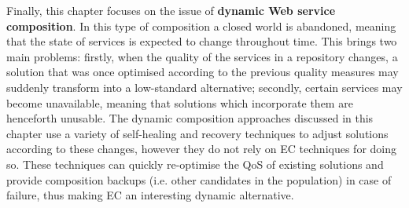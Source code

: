 Finally, this chapter focuses on the issue of \textbf{dynamic Web service composition}. In this type of composition a closed world is abandoned, meaning that the state of services is expected to change throughout time. This brings two main problems: firstly, when the quality of the services in a repository changes, a solution that was once optimised according to the previous quality measures may suddenly transform into a low-standard alternative; secondly, certain services may become unavailable, meaning that solutions which incorporate them are henceforth unusable. The dynamic composition approaches discussed in this chapter use a variety of self-healing and recovery techniques to adjust solutions according to these changes, however they do not rely on EC techniques for doing so. These techniques can quickly re-optimise the QoS of existing solutions and provide composition backups (i.e. other candidates in the population) in case of failure, thus making EC an interesting dynamic alternative.
